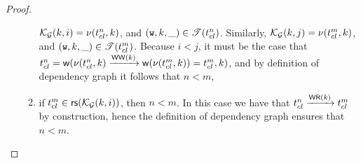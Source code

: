 \begin{proof}
\begin{enumerate}[label=(\roman*)]
\begin{enumerate}
$\mathcal{K}_{\mathcal{G}}(k, i) = \nu(t_{cl}^{n}, k)$, and $(\textnormal{\texttt w}, k, \_) \in \mathscr{T}(t_{cl}^{n})$. 
Similarly, $\mathcal{K}_{\mathcal{G}}(k, j) = \nu(t_{cl}^{m}, k)$, and $(\textnormal{\texttt w}, k, \_) \in \mathscr{T}(t_{cl}^{m})$. 
Because $i < j$, it must be the case that $\txid_{\cl}^{n} = \WTx(\ver(\txid_{\cl}^{n}, \key) \xrightarrow{\VO(\key)} 
\WTx(\ver(\txid_{\cl}^{m}, \key)) = \txid_{\cl}^{m}, \key)$, and by definition of dependency graph it follows that 
$n < m$, 
\item if $\txid_{\cl}^{m} \in \RTx(\hh_{\Gr}(\key, i))$, then $n < m$. In this case we have that 
$t_{cl}^{n} \xrightarrow{\mathsf{WR}(k)} t_{cl}^{m}$ by construction, hence the definition 
of dependency graph ensures that $n < m$. 
\end{enumerate}
\end{enumerate}
\end{proof}

